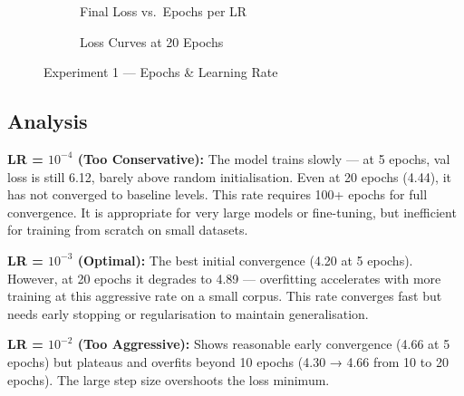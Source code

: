 \documentclass[12pt,a4paper]{article}
\begin{document}
\begin{figure}[H]
  \centering
  \begin{subfigure}{0.48\textwidth}
    \caption{Final Loss vs.\ Epochs per LR}
  \end{subfigure}
  \hfill
  \begin{subfigure}{0.48\textwidth}
    \caption{Loss Curves at 20 Epochs}
  \end{subfigure}
  \caption{Experiment 1 — Epochs \& Learning Rate}
\end{figure}

\subsection{Analysis}

\textbf{LR = $10^{-4}$ (Too Conservative):} The model trains slowly — at 5 epochs, val loss is still 6.12, barely above random initialisation. Even at 20 epochs (4.44), it has not converged to baseline levels. This rate requires 100+ epochs for full convergence. It is appropriate for very large models or fine-tuning, but inefficient for training from scratch on small datasets.

\textbf{LR = $10^{-3}$ (Optimal):} The best initial convergence (4.20 at 5 epochs). However, at 20 epochs it degrades to 4.89 — overfitting accelerates with more training at this aggressive rate on a small corpus. This rate converges fast but needs early stopping or regularisation to maintain generalisation.

\textbf{LR = $10^{-2}$ (Too Aggressive):} Shows reasonable early convergence (4.66 at 5 epochs) but plateaus and overfits beyond 10 epochs (4.30 → 4.66 from 10 to 20 epochs). The large step size overshoots the loss minimum.
\end{document}
